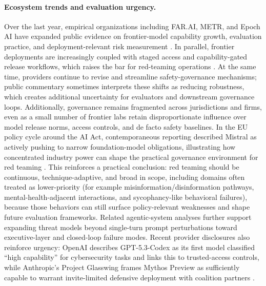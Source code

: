 \paragraph{Ecosystem trends and evaluation urgency.}
Over the last year, empirical organizations including FAR.AI, METR, and Epoch
AI have expanded public evidence on frontier-model capability growth, evaluation
practice, and deployment-relevant risk measurement
\citep{bowen2024scalingtrends,metr2025deepseekqwen,metr2026timehorizon,epoch2025impact}. In
parallel, frontier deployments are increasingly coupled with staged access and
capability-gated release workflows, which raises the bar for red-teaming
operations \citep{openai2026trustedcyber,anthropic2026glasswing}. At the same
time, providers continue to revise and streamline safety-governance mechanisms;
public commentary sometimes interprets these shifts as reducing robustness,
which creates additional uncertainty for evaluators and downstream governance
loops. Additionally, governance remains fragmented across jurisdictions and
firms, even as a small number of frontier labs retain disproportionate
influence over model release norms, access controls, and de facto safety
baselines. In the EU policy cycle around the AI Act, contemporaneous reporting
described Mistral as actively pushing to narrow foundation-model obligations,
illustrating how concentrated industry power can shape the practical governance
environment for red teaming
\citep{lomas2023mistraleuai,goldman2023euaiactmistral}. This reinforces a practical conclusion: red teaming should be
continuous, technique-adaptive, and broad in scope, including domains often
treated as lower-priority (for example misinformation/disinformation pathways,
mental-health-adjacent interactions, and sycophancy-like behavioral failures),
because those behaviors can still surface policy-relevant weaknesses and shape
future evaluation frameworks. Related agentic-system analyses
\citep{radanliev2026agenticthreats} further support expanding threat models
beyond single-turn prompt perturbations toward executive-layer and closed-loop
failure modes. Recent provider disclosures also reinforce urgency: OpenAI
describes GPT-5.3-Codex as its first model classified ``high capability'' for
cybersecurity tasks and links this to trusted-access controls, while Anthropic's
Project Glasswing frames Mythos Preview as sufficiently capable to warrant
invite-limited defensive deployment with coalition partners
\citep{openai2026gpt53codex,openai2026trustedcyber,anthropic2026glasswing}.
